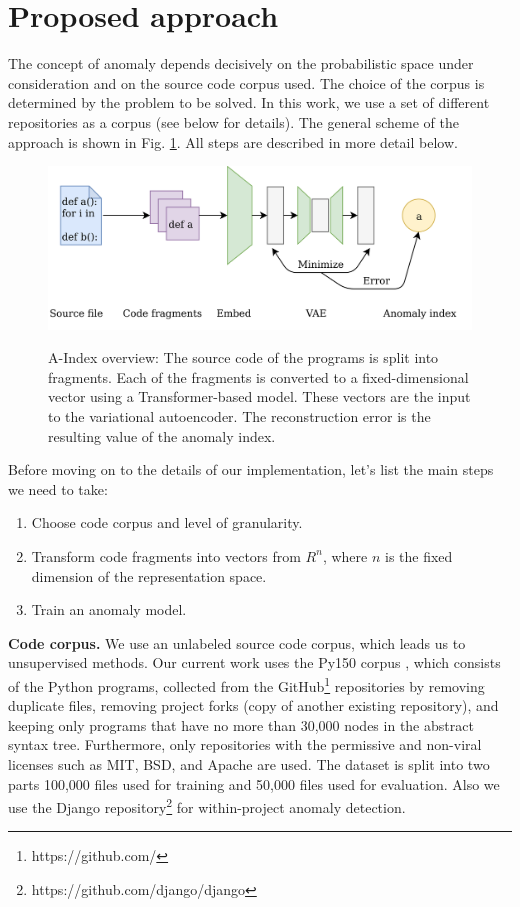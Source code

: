 \documentclass[10pt,conference]{IEEEtran}
\begin{document}
\section{Proposed approach}\label{approach}

The concept of anomaly depends decisively on the probabilistic space under consideration and on the source code corpus used.
The choice of the corpus is determined by the problem to be solved.
In this work, we use a set of different repositories as a corpus (see below for details).
The general scheme of the approach is shown in Fig. \ref{approach}. All steps are described in more detail below.

\begin{figure}[htbp]
\caption{{\sc A-Index} overview:
The source code of the programs is split into fragments.
Each of the fragments is converted to a fixed-dimensional vector using a Transformer-based model.
These vectors are the input to the variational autoencoder.
The reconstruction error is the resulting value of the anomaly index.}
\centering
\includegraphics[width=1.0\textwidth]{approach}
\label{approach}
\end{figure}

Before moving on to the details of our implementation, let's list the main steps we need to take:
\begin{enumerate}
\item Choose code corpus and level of granularity.
\item Transform code fragments into vectors from $R^n$, where $n$ is the fixed dimension of the representation space.
\item Train an anomaly model.
\end{enumerate}


{\bf Code corpus.}
We use an unlabeled source code corpus, which leads us to unsupervised methods.
Our current work uses the Py150 corpus \cite{RaychevEtAl2016},
 which consists of the Python programs, collected from the GitHub\footnote{https://github.com/} repositories
 by removing duplicate files, removing project forks (copy of another existing repository),
 and keeping only programs that have no more than 30,000 nodes in the abstract syntax tree.
Furthermore, only repositories with the permissive and non-viral licenses such as MIT, BSD, and Apache are used.
The dataset is split into two parts 100,000 files used for training and 50,000 files used for evaluation. 
Also we use the Django repository\footnote{https://github.com/django/django} for within-project anomaly detection.
  
\end{document}
